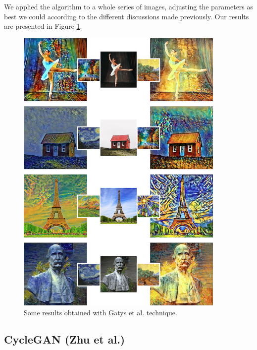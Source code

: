 \documentclass[twocolumn,superscriptaddress,aps,floatfix, nofootinbib]{revtex4-1}
\begin{document}
    We applied the algorithm to a whole series of images, adjusting the parameters as best we could according to the different discussions made previously. Our results are presented in Figure \ref{fig:final.results.gatys}.
    
    \begin{figure}
        \centering
        \includegraphics[width=0.90\textwidth]{resources/png/gatys-final.png}
        \caption{Some results obtained with Gatys et al. technique.}
        \label{fig:final.results.gatys}
    \end{figure}
    
    \subsection{CycleGAN (Zhu et al.)}\label{sec:results.zhu}
    
\end{document}
